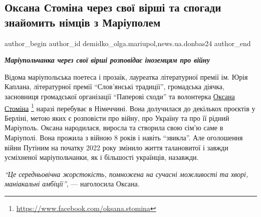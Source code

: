  
 
 
 
 
 
\subsection{Оксана Стоміна через свої вірші та спогади знайомить німців з Маріуполем}
\label{sec:26_09_2022.stz.news.ua.donbas24.1.oksana_stomina_virshi_spogady_znajom_nimci_mrpl}
 
\ifcmt
 author_begin
   author_id demidko_olga.mariupol,news.ua.donbas24
 author_end
\fi


\begin{center}
  \em\bfseries\Large
Маріупольчанка через свої вірші розповідає іноземцям про війну
\end{center}

Відома маріупольська поетеса і прозаїк, лауреатка літературної премії ім. Юрія
Каплана, літературної премії \enquote{Слов'янські традиції}, громадська діячка,
засновниця громадської організації \enquote{Паперові сходи} та волонтерка \href{https://www.facebook.com/oksana.stomina}{Оксана
Стоміна}%
\footnote{\url{https://www.facebook.com/oksana.stomina}} %
наразі перебуває в Німеччині. Вона долучилася до декількох проєктів у Берліні,
метою яких є розповісти про війну, про Україну та про її рідний Маріуполь.
Оксана народилася, виросла та створила свою сім'ю саме в Маріуполі.  Вона
прожила з війною 8 років і навіть \enquote{звикла}. Але оголошення війни
Путіним на початку 2022 року змінило життя талановитої і завжди усміхненої
маріупольчанки, як і більшості українців, назавжди.

\begin{leftbar}
\emph{\enquote{Це середньовічна жорстокість, помножена на сучасні можливості та хворі, маніакальні амбіції}}, — наголосила Оксана.
\end{leftbar}

